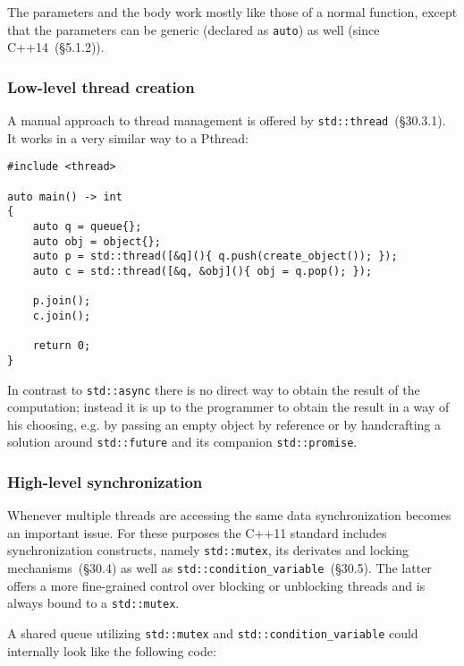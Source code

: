 The parameters and the body work mostly like those of a normal function, except that the parameters can be generic (declared as \texttt{auto}) as well (since C++14~\cite{cpp14std}(§5.1.2)).

\subsubsection{Low-level thread creation}

A manual approach to thread management is offered by \texttt{std::thread}~\cite{cpp11std}(§30.3.1). It works in a very similar way to a Pthread:

\begin{lstlisting}
#include <thread>

auto main() -> int
{
    auto q = queue{};
    auto obj = object{};
    auto p = std::thread([&q](){ q.push(create_object()); });
    auto c = std::thread([&q, &obj](){ obj = q.pop(); });
    
    p.join();
    c.join();
    
    return 0;
}
\end{lstlisting}

In contrast to \texttt{std::async} there is no direct way to obtain the result of the computation; instead it is up to the programmer to obtain the result in a way of his choosing, e.g. by passing an empty object by reference or by handcrafting a solution around \texttt{std::future} and its companion \texttt{std::promise}.

\subsubsection{High-level synchronization}\label{queue:mutex}

Whenever multiple threads are accessing the same data synchronization becomes an important issue. For these purposes the C++11 standard includes synchronization constructs, namely \texttt{std::mutex}, its derivates and locking mechanisms~\cite{cpp11std}(§30.4) as well as \texttt{std::condition\_variable}~\cite{cpp11std}(§30.5). The latter offers a more fine-grained control over blocking or unblocking threads and is always bound to a \texttt{std::mutex}.

A shared queue utilizing \texttt{std::mutex} and \texttt{std::condition\_variable} could internally look like the following code:

